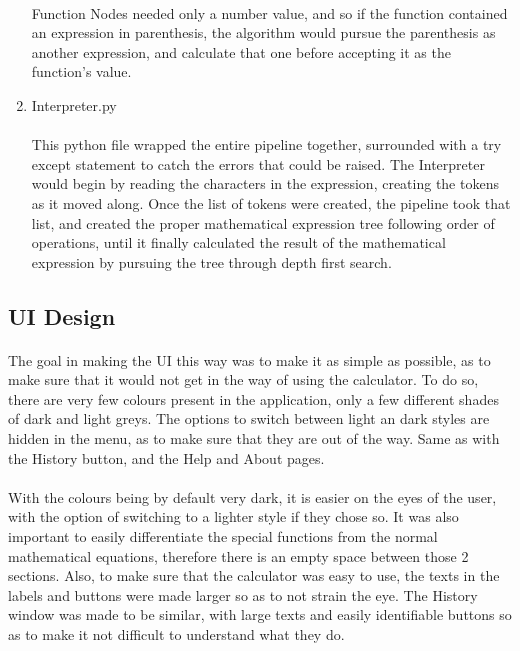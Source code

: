 \begin{enumerate}
            \paragraph{}
            Function Nodes needed only a number value, and so if the function contained an expression in parenthesis, the algorithm would pursue the parenthesis as another expression, and calculate that one before accepting it as the function’s value.

            \item Interpreter.py
            \paragraph{}
            This python file wrapped the entire pipeline together, surrounded with a try except statement to catch the errors that could be raised. The Interpreter would begin by reading the characters in the expression, creating the tokens as it moved along. Once the list of tokens were created, the pipeline took that list, and created the proper mathematical expression tree following order of operations, until it finally calculated the result of the mathematical expression by pursuing the tree through depth first search.
        \end{enumerate}

    \subsection{UI Design}
    \paragraph{}
    The goal in making the UI this way was to make it as simple as possible, as to make sure that it would not get in the way of using the calculator. To do so, there are very few colours present in the application, only a few different shades of dark and light greys. The options to switch between light an dark styles are hidden in the menu, as to make sure that they are out of the way. Same as with the History button, and the Help and About pages.

    \paragraph{}
    With the colours being by default very dark, it is easier on the eyes of the user, with the option of switching to a lighter style if they chose so. It was also important to easily differentiate the special functions from the normal mathematical equations, therefore there is an empty space between those 2 sections. Also, to make sure that the calculator was easy to use, the texts in the labels and buttons were made larger so as to not strain the eye. The History window was made to be similar, with large texts and easily identifiable buttons so as to make it not difficult to understand what they do.



